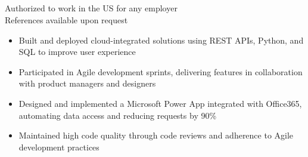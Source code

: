{\begin{minipage}[t]{13.5cm}
\begin{minipage}[t]{6.5cm}
      \hfill{}\\
      \par\medskip
      \hfill{}\\
      \hfill{}\\
      \hfill{}\\
    \end{minipage}
    \par\bigskip
    \par\bigskip
    \begin{minipage}{13.5cm}
      \begin{center}
        Authorized to work in the US for any employer\\
        References available upon request
      \end{center}
    \end{minipage}
  \end{minipage}
}
\makecvheader

\par\bigskip
{}
\par\smallskip
\begin{minipage}{13.75cm}
  \begin{minipage}{6.5cm}
    \begin{itemize}
      \item Built and deployed cloud-integrated solutions using REST APIs, Python, and SQL to improve user experience
      \item Participated in Agile development sprints, delivering features in collaboration with product managers and designers
    \end{itemize}
  \end{minipage}
  \hfill
  \begin{minipage}{6.5cm}
    \begin{itemize}
      \item Designed and implemented a Microsoft Power App integrated with Office365, automating data access and reducing requests by 90\%
      \item Maintained high code quality through code reviews and adherence to Agile development practices
    \end{itemize}
  \end{minipage}
\end{minipage}
\par\smallskip
\divider

